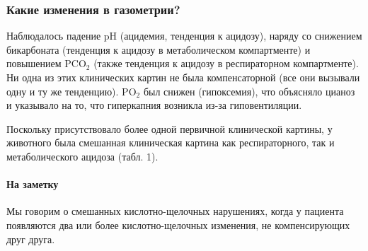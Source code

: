 \documentclass[a4paper,12pt]{book}
\begin{document}
\subsubsection*{Какие изменения в газометрии?}
Наблюдалось падение pH (ацидемия, тенденция к ацидозу), наряду со снижением бикарбоната (тенденция к ацидозу в метаболическом компартменте) и повышением $\mathrm{PCO_2}$ (также тенденция к ацидозу в респираторном компартменте). Ни одна из этих клинических картин не была компенсаторной (все они вызывали одну и ту же тенденцию). $\mathrm{PO_2}$ был снижен (гипоксемия), что объясняло цианоз и указывало на то, что гиперкапния возникла из-за гиповентиляции.

Поскольку присутствовало более одной первичной клинической картины, у животного была смешанная клиническая картина как респираторного, так и метаболического ацидоза (табл. 1).

\paragraph{На заметку}
Мы говорим о смешанных кислотно-щелочных нарушениях, когда у пациента появляются два или более кислотно-щелочных изменения, не компенсирующих друг друга.
\end{document}
